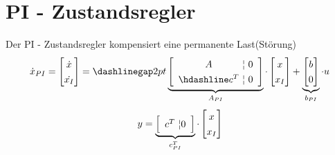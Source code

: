 



\section{PI - Zustandsregler}
Der PI - Zustandsregler kompensiert eine permanente Last(Störung)
\[
	\dot x_{PI}
	=
	\begin{bmatrix}
	\dot{x} \\
	\dot{x_I} \\
	\end{bmatrix}
	=
	\setlength{\tabcolsep}{10pt} %
	\renewcommand*{\arraystretch}{1.3} %
	\setlength{\dashlinegap}{2pt}
	\underbrace{\left[\begin{array}{c @{$ ¦ $}c}
	A & 0  \\ \hdashline
	c^T & 0   \\
	\end{array}\right]}_{A_{PI}}
	\cdot
	\begin{bmatrix}
	x \\
	x_I \\
	\end{bmatrix}
	+
	\underbrace{\begin{bmatrix}
	b \\
	0 \\
	\end{bmatrix}}_{b_{PI}}
	\cdot
	u
\]
\[
	y =
	\underbrace{\left[\begin{array}{c @{$ ¦$} c}
		c^T & 0
		\end{array}\right]}_{c^T_{PI}}
	\cdot
	\begin{bmatrix}
	x \\
	x_I \\
	\end{bmatrix}
\]

